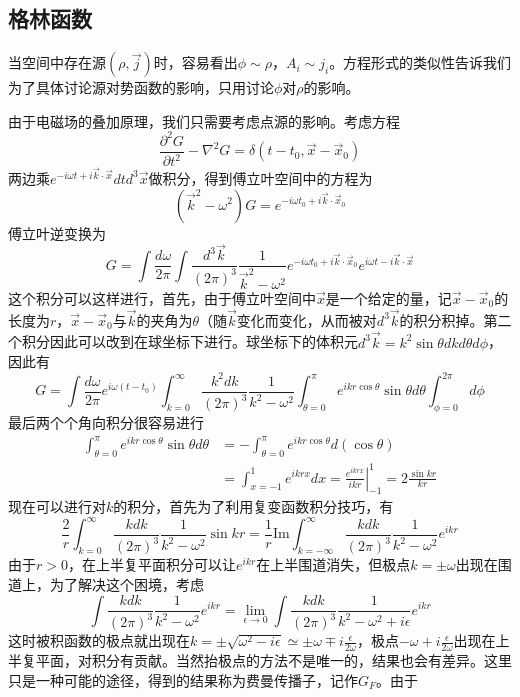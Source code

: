 \documentclass[a4paper,11pt]{ctexart}
\newcommand{\beq}{\begin{equation}}
\newcommand{\eeq}{\end{equation}}
\newcommand{\bea}{\begin{equation}\begin{aligned}}
\newcommand{\eea}{\end{aligned}\end{equation}}
\begin{document}
\subsection{格林函数}
当空间中存在源$(\rho,\vec{j})$时，容易看出$\phi \sim \rho$，$A_i \sim j_i$。方程形式的类似性告诉我们为了具体讨论源对势函数的影响，只用讨论$\phi$对$\rho$的影响。
\par
由于电磁场的叠加原理，我们只需要考虑点源的影响。考虑方程
\beq
\frac{\partial^2 G}{\partial t^2} - \nabla^2 G= \delta(t-t_0,\vec{x}-\vec{x}_0)
\eeq
两边乘$e^{-i\omega t + i \vec{k} \cdot \vec{x}} dt d^3 \vec{x}$做积分，得到傅立叶空间中的方程为
\beq
(\vec{k}^2 - \omega^2 ) G= e^{-i\omega t_0 + i \vec{k} \cdot \vec{x}_0}
\eeq
傅立叶逆变换为
\beq
G = \int \frac{d\omega}{2\pi} \int \frac{d^3 \vec{k}}{(2\pi)^3} \frac{1}{\vec{k}^2-\omega^2} e^{-i\omega t_0 + i \vec{k} \cdot \vec{x}_0} e^{i\omega t - i \vec{k} \cdot \vec{x}}
\eeq
这个积分可以这样进行，首先，由于傅立叶空间中$\vec{x}$是一个给定的量，记$\vec{x}-\vec{x}_0$的长度为$r$，$\vec{x}-\vec{x}_0$与$\vec{k}$的夹角为$\theta$（随$\vec{k}$变化而变化，从而被对$d^3 \vec{k}$的积分积掉。第二个积分因此可以改到在球坐标下进行。球坐标下的体积元$d^3 \vec{k} = k^2 \sin \theta dk d\theta d\phi$，因此有
\beq
G = \int \frac{d\omega}{2\pi} e^{i\omega ( t - t_0)}  \int_{k=0}^\infty \frac{k^2 dk}{(2\pi)^3} \frac{1}{k^2 - \omega^2} \int_{\theta = 0}^\pi e^{ikr\cos \theta } \sin \theta d\theta \int_{\phi = 0}^{2\pi}d\phi
\eeq
最后两个个角向积分很容易进行
\bea
\int_{\theta = 0}^\pi e^{ikr \cos \theta} \sin \theta d\theta &= -\int_{\theta = 0}^{\pi} e^{ikr \cos \theta} d(\cos \theta) \\
&= \int_{x = -1}^1 e^{ikrx}dx = \left. \frac{e^{ikrx}}{ikr} \right|_{-1}^1 = 2\frac{\sin kr}{kr}
\eea
现在可以进行对$k$的积分，首先为了利用复变函数积分技巧，有
\beq
\frac{2}{r} \int_{k=0}^\infty \frac{k dk}{(2\pi)^3} \frac{1}{k^2 - \omega^2}\sin kr = \frac{1}{r} \mathrm{Im} \int_{k=-\infty}^\infty \frac{k dk}{(2\pi)^3} \frac{1}{k^2 - \omega^2} e^{ikr} 
\eeq
由于$r>0$，在上半复平面积分可以让$e^{ikr}$在上半围道消失，但极点$k = \pm \omega$出现在围道上，为了解决这个困境，考虑
\beq
\int \frac{k dk}{(2\pi)^3} \frac{1}{k^2 - \omega^2} e^{ikr}  = \lim_{\epsilon \to 0} \int \frac{k dk}{(2\pi)^3} \frac{1}{k^2 - \omega^2 + i \epsilon} e^{ikr} 
\eeq
这时被积函数的极点就出现在$k = \pm \sqrt{\omega^2 - i\epsilon} \simeq \pm \omega \mp i\frac{\epsilon}{2\omega}$，极点$-\omega + i \frac{\epsilon}{2\omega} $出现在上半复平面，对积分有贡献。当然抬极点的方法不是唯一的，结果也会有差异。这里只是一种可能的途径，得到的结果称为费曼传播子，记作$G_F$。由于
\end{document}
